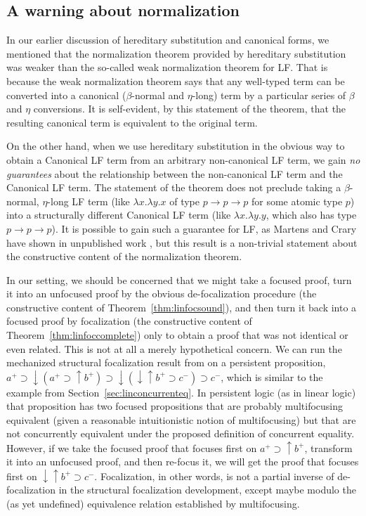 \subsection{A warning about normalization}
\label{sec:warning}

In our earlier discussion of hereditary substitution and canonical
forms, we mentioned that the normalization theorem provided by
hereditary substitution was weaker than the so-called weak
normalization theorem for LF. That is because the weak normalization
theorem says that any well-typed term can be converted into a
canonical ($\beta$-normal and $\eta$-long) term by a particular series
of $\beta$ and $\eta$ conversions. It is self-evident, by this statement
of the theorem, that the resulting canonical term is equivalent
to the original term. 

On the other hand, when we use hereditary substitution in the obvious
way to obtain a Canonical LF term from an arbitrary non-canonical LF
term, we gain {\it no guarantees} about the relationship between the
non-canonical LF term and the Canonical LF term. The statement of the
theorem does not preclude taking a $\beta$-normal, $\eta$-long LF term
(like $\lambda x. \lambda y. x$ of type $p \rightarrow p \rightarrow
p$ for some atomic type $p$) into a structurally different Canonical
LF term (like $\lambda x. \lambda y. y$, which also has type $p
\rightarrow p \rightarrow p$). It is possible to gain such a guarantee
for LF, as Martens and Crary have shown in unpublished work
\cite{martens11mechanizing}, but this result is a non-trivial statement
about the constructive content of the normalization theorem. 

In our setting, we should be concerned that we might take a focused
proof, turn it into an unfocused proof by the obvious de-focalization
procedure (the constructive content of
Theorem~\ref{thm:linfocsound}), and then turn it back into a focused
proof by focalization (the constructive content of
Theorem~\ref{thm:linfoccomplete}) only to obtain a proof that was not
identical or even related. This is not at all a merely hypothetical
concern. We can run the mechanized structural focalization result from
\cite{simmons11structural} on a persistent proposition,
%
   $a^+ \supset 
   {\downarrow}(a^+ \supset {\uparrow}b^+) \supset
   {\downarrow}({\downarrow}{\uparrow}b^+ \supset c^-) \supset
   c^-$, 
%
which is similar to the example from
Section~\ref{sec:linconcurrenteq}.  In persistent logic (as in
linear logic) that proposition has two focused propositions that
are probably multifocusing equivalent (given a reasonable intuitionistic
notion of multifocusing) but that are not concurrently equivalent
under the proposed definition of concurrent equality. 
However, if we take the focused proof that focuses 
first on $a^+ \supset {\uparrow}b^+$, transform it into an unfocused 
proof, and then re-focus it, we will get the proof that focuses 
first on ${\downarrow}{\uparrow}b^+ \supset c^-$. Focalization,
in other words, is not a partial inverse of de-focalization in the structural
focalization development, except maybe modulo the (as yet undefined)
equivalence relation established by multifocusing. 

